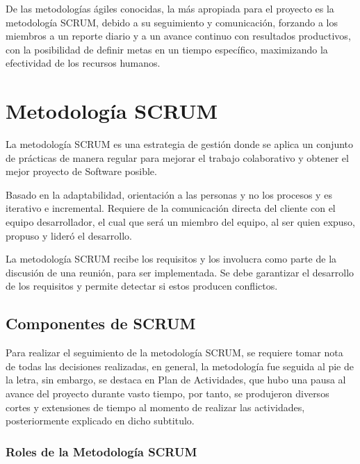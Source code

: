 De las metodologías ágiles conocidas, la más apropiada para el proyecto es la metodología SCRUM, debido a su seguimiento y comunicación, forzando a los miembros a un reporte diario y a un avance continuo con resultados productivos, con la posibilidad de definir metas en un tiempo específico, maximizando la efectividad de los recursos humanos.

\section{Metodología SCRUM}

La metodología SCRUM es una estrategia de gestión donde se aplica un conjunto de prácticas de manera regular para mejorar el trabajo colaborativo y obtener el mejor proyecto de Software posible\cite{scrumdiapo}.

Basado en la adaptabilidad, orientación a las personas y no los procesos y es iterativo e incremental. Requiere de la comunicación directa del cliente con el equipo desarrollador, el cual que será un miembro del equipo, al ser quien expuso, propuso y lideró el desarrollo.

La metodología SCRUM recibe los requisitos y los involucra como parte de la discusión de una reunión, para ser implementada. Se debe garantizar el desarrollo de los requisitos y permite detectar si estos producen conflictos.

\subsection{Componentes de SCRUM}

Para realizar el seguimiento de la metodología SCRUM, se requiere tomar nota de todas las decisiones realizadas, en general, la metodología fue seguida al pie de la letra, sin embargo, se destaca en Plan de Actividades, que hubo una pausa al avance del proyecto durante vasto tiempo, por tanto, se produjeron diversos cortes y extensiones de tiempo al momento de realizar las actividades, posteriormente explicado en dicho subtitulo.

\subsubsection{Roles de la Metodología SCRUM}

